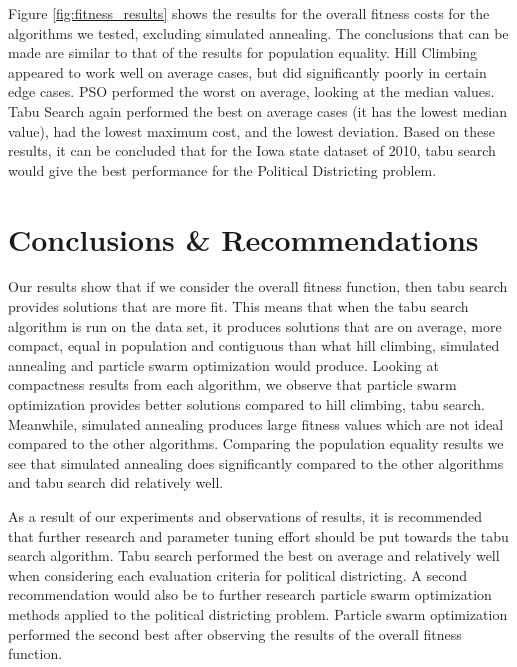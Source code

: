 \documentclass[journal]{IEEEtran}
\begin{document}
Figure \ref{fig:fitness_results} shows the results for the overall fitness costs for the algorithms we tested, excluding simulated annealing. The conclusions that can be made are similar to that of the results for population equality. Hill Climbing appeared to work well on average cases, but did significantly poorly in certain edge cases. PSO performed the worst on average, looking at the median values. Tabu Search again performed the best on average cases (it has the lowest median value), had the lowest maximum cost, and the lowest deviation. Based on these results, it can be concluded that for the Iowa state dataset of 2010, tabu search would give the best performance for the Political Districting problem. 

\section{Conclusions \& Recommendations}
Our results show that if we consider the overall fitness function, then tabu search provides solutions that are more fit. This means that when the tabu search algorithm is run on the data set, it produces solutions that are on average, more compact, equal in population and contiguous than what hill climbing, simulated annealing and particle swarm optimization would produce. Looking at compactness results from each algorithm, we observe that particle swarm optimization provides better solutions compared to hill climbing, tabu search. Meanwhile, simulated annealing produces large fitness values which are not ideal compared to the other algorithms. Comparing the population equality results we see that simulated annealing does significantly compared to the other algorithms and tabu search did relatively well.

As a result of our experiments and observations of results, it is recommended that further research and parameter tuning effort should be put towards the tabu search algorithm. Tabu search performed the best on average and relatively well when considering each evaluation criteria for political districting. A second recommendation would also be to further research particle swarm optimization methods applied to the political districting problem. Particle swarm optimization performed the second best after observing the results of the overall fitness function.
\end{document}
